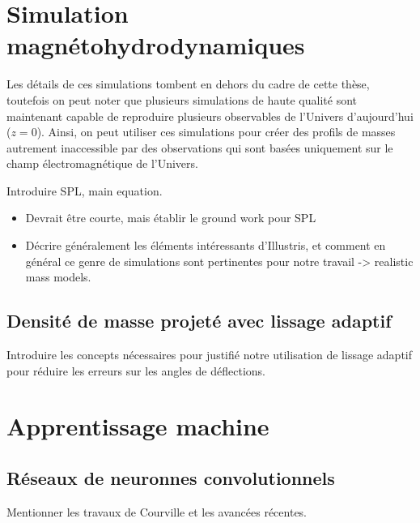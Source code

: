 \section{Simulation magnétohydrodynamiques}\label{sec:simulation magnetohydrodynamique}
Les détails de ces simulations tombent en dehors du cadre de cette thèse, 
toutefois on peut noter que plusieurs simulations de haute qualité sont maintenant 
capable de reproduire plusieurs observables de l'Univers d'aujourd'hui ($z=0$). 
Ainsi, on peut utiliser ces simulations pour créer des profils de masses 
autrement inaccessible par des observations qui sont basées uniquement 
sur le champ électromagnétique de l'Univers.

Introduire SPL, main equation.
\begin{itemize}
        \item Devrait être courte, mais établir le ground work pour 
                SPL
        \item Décrire généralement les éléments intéressants d'Illustris, et
                comment en général ce genre de simulations sont pertinentes 
                pour notre travail -> realistic mass models.
\end{itemize}


\subsection{Densité de masse projeté avec lissage adaptif}
Introduire les concepts nécessaires pour justifié notre utilisation de 
lissage adaptif pour réduire les erreurs sur les angles de déflections.


\section{Apprentissage machine}\label{sec:apprentissage machine}

\subsection{Réseaux de neuronnes convolutionnels}
Mentionner les travaux de Courville et les avancées récentes.

